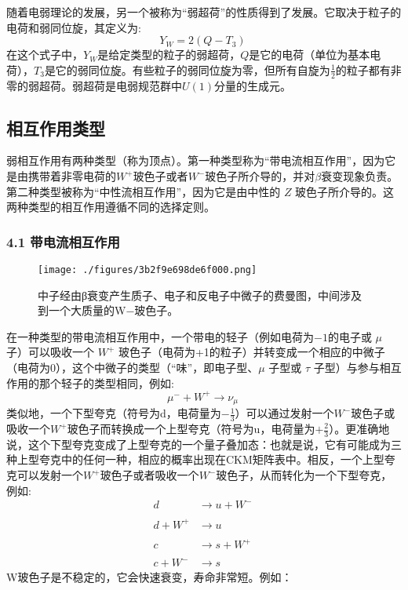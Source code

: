 随着电弱理论的发展，另一个被称为“弱超荷”的性质得到了发展。它取决于粒子的电荷和弱同位旋，其定义为:
$$Y_{W}=2(Q-T_{3})~$$
在这个式子中，$Y_{W}$是给定类型的粒子的弱超荷，$Q$是它的电荷（单位为基本电荷），$T_{3}$是它的弱同位旋。有些粒子的弱同位旋为零，但所有自旋为$\frac{1}{2}$的粒子都有非零的弱超荷。弱超荷是电弱规范群中$U(1)$分量的生成元。

\subsection{ 相互作用类型}
弱相互作用有两种类型（称为顶点）。第一种类型称为“带电流相互作用”，因为它是由携带着非零电荷的$W^{+}$玻色子或者$W^{-}$玻色子所介导的，并对$\beta$衰变现象负责。第二种类型被称为“中性流相互作用”，因为它是由中性的 $Z$ 玻色子所介导的。这两种类型的相互作用遵循不同的选择定则。

\subsubsection{4.1 带电流相互作用}
\begin{figure}[ht]
\centering
\texttt{[image: ./figures/3b2f9e698de6f000.png]}
\caption{中子经由β衰变产生质子、电子和反电子中微子的费曼图，中间涉及到一个大质量的W−玻色子。} \label{fig_RXHZY_6}
\end{figure}

在一种类型的带电流相互作用中，一个带电的轻子（例如电荷为$-1$的电子或 $\mu$ 子）可以吸收一个 $W^+$ 玻色子（电荷为+1的粒子）并转变成一个相应的中微子（电荷为$0$），这个中微子的类型（“味”，即电子型、$\mu$ 子型或 $\tau$ 子型）与参与相互作用的那个轻子的类型相同，例如:
$$\mu^- + W^+ \rightarrow \nu_\mu~$$
类似地，一个下型夸克（符号为d，电荷量为$-\frac{1}{3}$）可以通过发射一个$W^-$玻色子或吸收一个$W^+$玻色子而转换成一个上型夸克（符号为u，电荷量为$+\frac{2}{3}$）。更准确地说，这个下型夸克变成了上型夸克的一个量子叠加态：也就是说，它有可能成为三种上型夸克中的任何一种，相应的概率出现在CKM矩阵表中。相反，一个上型夸克可以发射一个$W^+$玻色子或者吸收一个$W^-$玻色子，从而转化为一个下型夸克，例如:
\begin{equation}
\begin{aligned}
d &\rightarrow u + W^{-} \\\\
d + W^{+} &\rightarrow u \\\\
c &\rightarrow s + W^{+} \\\\
c + W^{-} &\rightarrow s
\end{aligned}~
\end{equation}
W玻色子是不稳定的，它会快速衰变，寿命非常短。例如：

